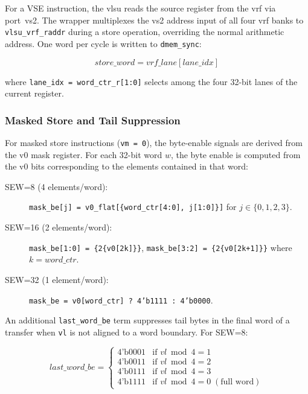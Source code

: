 For a VSE instruction, the \gls{vlsu} reads the source register from the \gls{vrf}
via port~vs2. The wrapper multiplexes the vs2 address input of all four \gls{vrf}
banks to \texttt{vlsu\_vrf\_raddr} during a store operation, overriding the normal
arithmetic address. One word per cycle is written to \texttt{dmem\_sync}:

\begin{equation}
\mathit{store\_word} = \mathit{vrf\_lane[lane\_idx]}
\end{equation}

where \texttt{lane\_idx = word\_ctr\_r[1:0]} selects among the four 32-bit lanes of
the current register.

\subsubsection{Masked Store and Tail Suppression}

For masked store instructions (\texttt{vm = 0}), the byte-enable signals are derived
from the v0 mask register. For each 32-bit word $w$, the byte enable is computed
from the v0 bits corresponding to the elements contained in that word:

\begin{description}
  \item[SEW=8 (4 elements/word):] \texttt{mask\_be[j] = v0\_flat[\{word\_ctr[4:0], j[1:0]\}]}
    for $j \in \{0,1,2,3\}$.
  \item[SEW=16 (2 elements/word):] \texttt{mask\_be[1:0] = \{2\{v0[2k]\}\}},
    \texttt{mask\_be[3:2] = \{2\{v0[2k+1]\}\}} where $k = \mathit{word\_ctr}$.
  \item[SEW=32 (1 element/word):] \texttt{mask\_be = v0[word\_ctr] ? 4'b1111 : 4'b0000}.
\end{description}

An additional \texttt{last\_word\_be} term suppresses tail bytes in the final word of
a transfer when \texttt{vl} is not aligned to a word boundary. For SEW=8:

\begin{equation}
\mathit{last\_word\_be} = \begin{cases}
  4\text{'b0001} & \text{if } \mathit{vl} \bmod 4 = 1 \\
  4\text{'b0011} & \text{if } \mathit{vl} \bmod 4 = 2 \\
  4\text{'b0111} & \text{if } \mathit{vl} \bmod 4 = 3 \\
  4\text{'b1111} & \text{if } \mathit{vl} \bmod 4 = 0 \;(\text{full word})
\end{cases}
\label{eq:last_word_be}
\end{equation}

